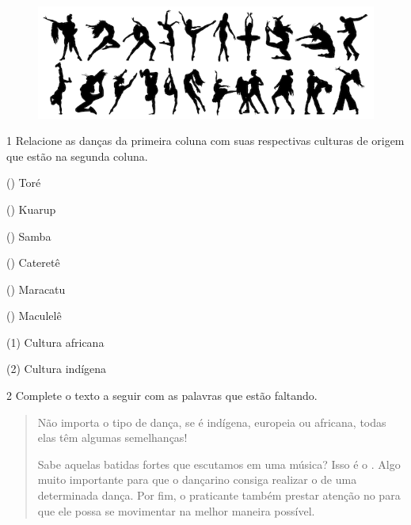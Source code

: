 \begin{figure}[htpb!]
\includegraphics[width=\textwidth]{./imgs/img11.png}
\end{figure}


\num{1} Relacione as danças da primeira coluna com suas respectivas culturas de
  origem que estão na segunda coluna.

\begin{multicols}{2}
() Toré
    
() Kuarup
    
() Samba

() Cateretê

() Maracatu

() Maculelê

\columnbreak

(1) Cultura africana\medskip

(2) Cultura indígena
\end{multicols}


\num{2} Complete o texto a seguir com as palavras que estão faltando.

\begin{quote}
Não importa o tipo de dança, se é indígena, europeia ou africana, todas
elas têm algumas semelhanças!

Sabe aquelas batidas fortes que escutamos em uma música? Isso é o \preencher{}.
Algo muito importante para que o dançarino consiga realizar o \preencher{} de
uma determinada dança. Por fim, o praticante também prestar atenção no
\preencher{} para que ele possa se movimentar na melhor maneira possível.
\end{quote}

